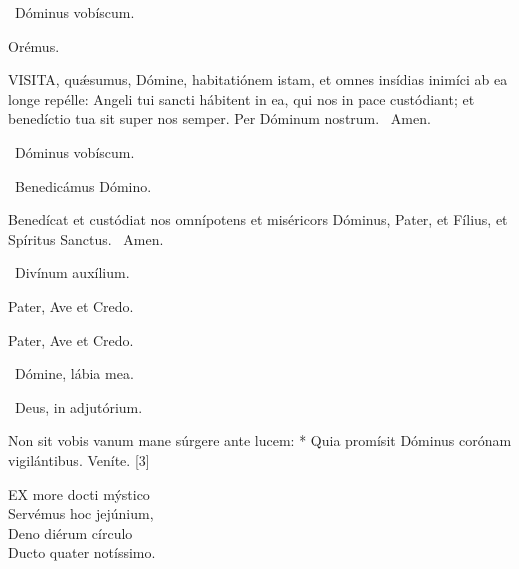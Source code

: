 \V\ Dóminus vobíscum.

Orémus. 

\lettrine[lines=2]{V}{ISITA}, quǽsumus, Dómine, habitatiónem istam, et omnes insídias inimíci ab ea longe repélle: Angeli tui sancti hábitent in ea, qui nos in pace custódiant; et benedíctio tua sit super nos semper. Per Dóminum nostrum. \R\ Amen.

\V\ Dóminus vobíscum.

\V\ Benedicámus Dómino.

 Benedícat et custódiat nos omnípotens et miséricors Dóminus, Pater, et Fílius, et Spíritus Sanctus. \R\ Amen.


\V\ Divínum auxílium.

Pater, Ave et Credo.

\sectionornament





Pater, Ave et Credo.

\V\ Dómine, lábia mea.

\V\ Deus, in adjutórium.



 Non sit vobis vanum mane súrgere ante lucem: * Quia promísit Dóminus corónam vigilántibus.  Veníte. [3]


\lettrine[lines=2]{E}{X} more docti mýstico\\
Servémus hoc jejúnium,\\
Deno diérum círculo\\
Ducto quater notíssimo.

